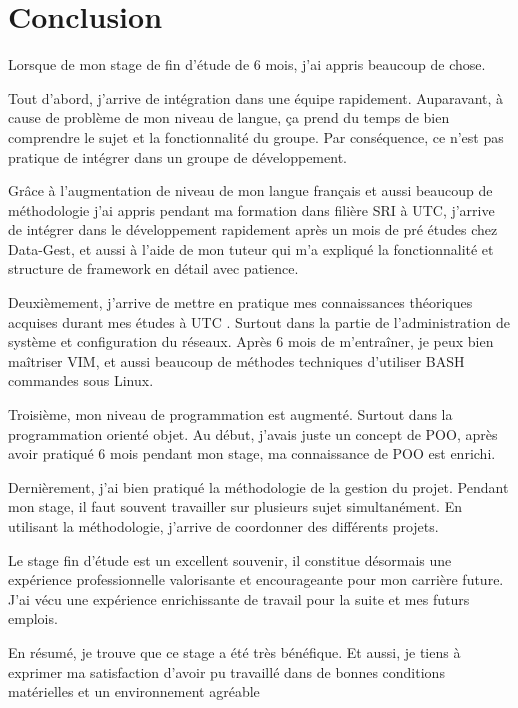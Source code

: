 \chapter{Conclusion}

Lorsque de mon stage de fin d'étude de 6 mois, j'ai appris beaucoup de chose.

Tout d'abord, j'arrive de intégration dans une équipe rapidement. Auparavant, à cause de problème de mon niveau de langue, ça prend du temps de bien comprendre le sujet et la fonctionnalité du groupe. Par conséquence, ce n'est pas pratique de intégrer dans un groupe de développement. 

Grâce à l'augmentation de niveau de mon langue français  et aussi beaucoup de méthodologie j'ai appris pendant ma formation dans filière SRI à UTC, j'arrive de intégrer dans le développement rapidement après un mois de pré études chez Data-Gest, et aussi à l'aide de mon tuteur qui m'a expliqué la  fonctionnalité et structure de framework en détail avec patience. 

Deuxièmement, j'arrive de  mettre en pratique mes connaissances théoriques acquises durant mes études à UTC . Surtout dans la partie de l'administration de système et configuration du réseaux. Après 6 mois de m'entraîner, je peux bien maîtriser VIM, et aussi beaucoup de méthodes techniques d'utiliser BASH commandes sous Linux.

Troisième, mon niveau de programmation est augmenté. Surtout dans la programmation orienté objet. Au début, j'avais juste un concept de POO, après avoir pratiqué 6 mois pendant mon stage, ma connaissance de POO est enrichi.

Dernièrement, j'ai bien pratiqué la méthodologie de la gestion du projet. Pendant mon stage, il faut souvent travailler sur plusieurs sujet simultanément. En utilisant la méthodologie, j'arrive de coordonner des différents projets. 

Le stage fin d'étude est un excellent souvenir, il constitue désormais une expérience professionnelle valorisante et encourageante pour mon carrière future. J'ai vécu une expérience enrichissante de travail pour la suite et mes futurs emplois. 

En résumé, je trouve que ce stage a été très bénéfique. Et aussi, je tiens à exprimer ma satisfaction d'avoir pu travaillé dans de bonnes conditions matérielles et un environnement agréable


